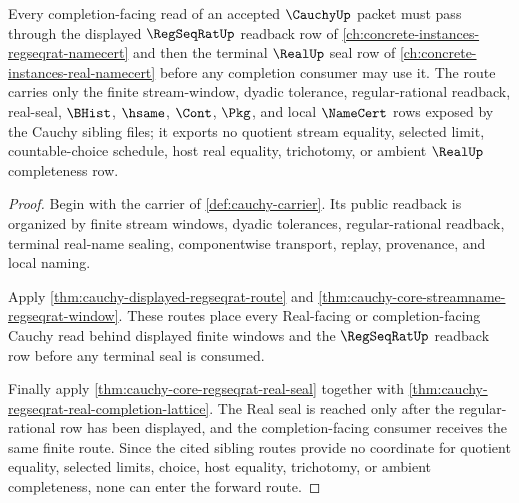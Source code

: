 \begin{theorem}
\label{thm:cauchy-forward-regseqrat-real-route}
Every completion-facing read of an accepted $\CauchyUp$ packet must pass through the displayed $\RegSeqRatUp$ readback row of \autoref{ch:concrete-instances-regseqrat-namecert} and then the terminal $\RealUp$ seal row of \autoref{ch:concrete-instances-real-namecert} before any completion consumer may use it. The route carries only the finite stream-window, dyadic tolerance, regular-rational readback, real-seal, $\BHist$, $\hsame$, $\Cont$, $\Pkg$, and local $\NameCert$ rows exposed by the Cauchy sibling files; it exports no quotient stream equality, selected limit, countable-choice schedule, host real equality, trichotomy, or ambient $\RealUp$ completeness row.
\end{theorem}
\begin{proof}
Begin with the carrier of \autoref{def:cauchy-carrier}. Its public readback is organized by finite stream windows, dyadic tolerances, regular-rational readback, terminal real-name sealing, componentwise transport, replay, provenance, and local naming.

Apply \autoref{thm:cauchy-displayed-regseqrat-route} and \autoref{thm:cauchy-core-streamname-regseqrat-window}. These routes place every Real-facing or completion-facing Cauchy read behind displayed finite windows and the $\RegSeqRatUp$ readback row before any terminal seal is consumed.

Finally apply \autoref{thm:cauchy-core-regseqrat-real-seal} together with \autoref{thm:cauchy-regseqrat-real-completion-lattice}. The Real seal is reached only after the regular-rational row has been displayed, and the completion-facing consumer receives the same finite route. Since the cited sibling routes provide no coordinate for quotient equality, selected limits, choice, host equality, trichotomy, or ambient completeness, none can enter the forward route.
\end{proof}
